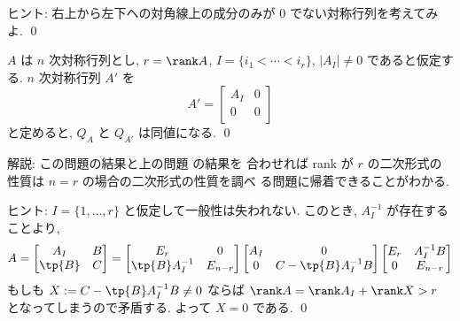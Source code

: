 \documentclass[12pt,twoside]{jarticle}
\begin{document}
\noindent
ヒント: 右上から左下への対角線上の成分のみが $0$ でない対称行列を考えてみよ.
\qed


\begin{question}
\label{q:n=rank}
  $A$ は $n$ 次対称行列とし, $r=\rank A$, $I=\{i_1<\cdots<i_r\}$, 
  $|A_I|\ne 0$ であると仮定する.  $n$ 次対称行列 $A'$ を
  \begin{equation*}
    A' =
    \begin{bmatrix}
      A_I & 0 \\
      0   & 0 \\
    \end{bmatrix}
  \end{equation*}
  と定めると, $Q_A$ と $Q_{A'}$ は同値になる. \qed
\end{question}

\noindent
解説: この問題の結果と上の問題  の結果を
合わせれば rank が $r$ の二次形式の性質は $n=r$ の場合の二次形式の性質を調べ
る問題に帰着できることがわかる.

\medskip
\noindent
ヒント: $I=\{1,\dots,r\}$ と仮定して一般性は失われない. 
このとき, $A_I^{-1}$ が存在することより,
\begin{equation*}
  A = 
  \begin{bmatrix}
    A_I    & B \\
    \tp{B} & C \\
  \end{bmatrix}
  =
  \begin{bmatrix}
    E_r            & 0 \\
    \tp{B}A_I^{-1} & E_{n-r} \\
  \end{bmatrix}
  \begin{bmatrix}
    A_I & 0 \\
    0   & C - \tp{B}A_I^{-1}B \\
  \end{bmatrix}
  \begin{bmatrix}
    E_r & A_I^{-1}B \\
    0   & E_{n-r} \\
  \end{bmatrix}
\end{equation*}
もしも $X := C - \tp{B}A_I^{-1}B\ne 0$ 
ならば $\rank A = \rank A_I + \rank X > r$ となってしまうので矛盾する.
よって $X = 0$ である.
\qed

\end{document}

